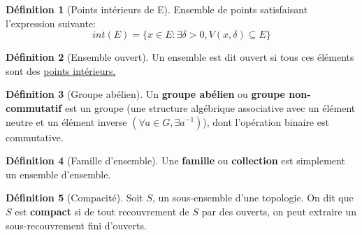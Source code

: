 \documentclass[12pt]{book}
\theoremstyle{definition}
\newtheorem{definition}{Définition}[section]
\begin{document}
\begin{definition}[Points intérieurs de E]
    \label{def:point_int}
    Ensemble de points satisfaisant l'expression
    suivante: $$int(E) = \{ x \in E : \exists \delta > 0, V(x, \delta) \subseteq E \} $$
\end{definition}

\begin{definition}[Ensemble ouvert]
    \label{def:ensemble_ouvert}
    Un ensemble est dit ouvert si tous ces éléments sont des \hyperref[def:point_int]{points intérieurs.}
\end{definition}

\begin{definition}[Groupe abélien]
    \label{def:groupe_abelien}
    Un \textbf{groupe abélien} ou \textbf{groupe non-commutatif} est un groupe
    (une structure algébrique associative avec un élément neutre et un élément inverse $(\forall a \in G, \exists a^{-1})$), 
    dont l'opération binaire est commutative.
\end{definition}

\begin{definition}[Famille d'ensemble]
    \label{def:famille}
    Une \textbf{famille} ou \textbf{collection} est simplement un ensemble d'ensemble.
\end{definition}

\begin{definition}[Compacité]
    \label{def:compacite}
    Soit $S$, un sous-ensemble d'une topologie. On dit que $S$ est \textbf{compact} si de tout recouvrement de $S$ par des ouverts, 
    on peut extraire un sous-recouvrement fini d'ouverts.
\end{definition}
\end{document}
